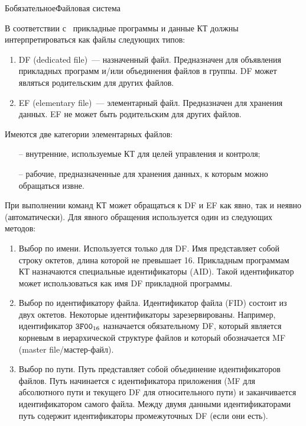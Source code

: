 \begin{appendix}{Б}{обязательное}{Файловая система}
\label{FILES}


В соответствии с~\cite{APDU} прикладные программы и данные КТ должны 
интерпретироваться как файлы следующих типов: 

\begin{enumerate}
\item
DF (dedicated file)~--- назначенный файл. 
Предназначен для объявления прикладных программ и/или объединения файлов в 
группы. DF может являться родительским для других файлов.

\item
EF (elementary file)~--- элементарный файл. 
Предназначен для хранения данных. 
EF не может быть родительским для других файлов.
\end{enumerate}

Имеются две категории элементарных файлов:
\begin{itemize}
\item[--] 
внутренние, используемые КТ для целей управления и контроля;  
\item[--]
рабочие, предназначенные для хранения данных, к которым можно обращаться извне.
\end{itemize}                                                            
                  
При выполнении команд КТ может обращаться к DF и EF как явно, так и неявно 
(автоматически). Для явного обращения используется один из следующих 
методов: 
\begin{enumerate}
\item
Выбор по имени. Используется только для DF. Имя представляет собой строку 
октетов, длина которой не превышает 16. Прикладным программам КТ назначаются  
специальные идентификаторы (AID). Такой идентификатор может использоваться 
как имя DF прикладной программы. 

\item
Выбор по идентификатору файла. Идентификатор файла (FID) состоит из двух октетов. 
Некоторые идентификаторы зарезервированы. Например, 
идентификатор $\texttt{3F00}_{16}$ назначается обязательному DF, 
который является корневым в иерархической структуре файлов и 
который обозначается MF (master file/мастер-файл). 

\item
Выбор по пути. Путь представляет собой объединение идентификаторов файлов. Путь 
начинается с идентификатора приложения (MF для абсолютного пути и текущего DF 
для относительного пути) и заканчивается идентификатором самого файла. Между 
двумя данными идентификаторами путь содержит идентификаторы промежуточных 
DF (если они есть). 


\end{enumerate}
\end{appendix}
